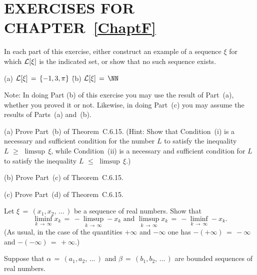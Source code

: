                        \section{EXERCISES FOR CHAPTER~\ref{ChaptF}}
                        \label{SectFEX}

\V
\V
\V
\V

\noindent \ExFa In each part of this exercise, either construct an example of a sequence ${\xi}$ for which ${\cal L}[{\xi}] $ is the indicated set, or show that no such sequence exists.

\V

        (a) ${\cal L}[{\xi}] \,=\, \{-1, 3, {\pi}\}$ \h (b) ${\cal L}[{\xi}] \,=\, {\NN}$

\V
\V


\noindent  \ExFb  Note: In doing Part (b) of this exercise you may use the result of Part~(a), whether you proved it or not.
    Likewise, in doing Part~(c) you may assume the results of Parts~(a) and~(b).

\V

        (a) Prove Part~(b) of Theorem~C.6.15. (Hint: Show that Condition~(i) is a necessary and sufficient condition for the number $L$ to satisfy the inequality $L\,\,{\geq}\,\,\limsup\,{\xi}$,
    while Condition~(ii) is a necessary and sufficient condition for $L$ to satisfy the inequality $L\,\,{\leq}\,\,\limsup\,{\xi}$.)

\V

        (b) Prove Part~(c) of Theorem~C.6.15. %

\V

        (c) Prove Part~(d) of Theorem~C.6.15.

\V
\V

\noindent \ExFc Let ${\xi} \,=\, (x_{1},x_{2},\,{\ldots}\,)$ be a sequence of real numbers.
    Show that
        \begin{displaymath}
        \liminf_{k \,{\rightarrow}\, {\infty}} x_{k} \,=\, -\limsup_{k \,{\rightarrow}\, {\infty}} -x_{k} \mbox{ and }
        \limsup_{k \,{\rightarrow}\, {\infty}} x_{k} \,=\, -\liminf_{k \,{\rightarrow}\, {\infty}} -x_{k}.
        \end{displaymath}
    (As usual, in the case of the quantities $+{\infty}$ and $-{\infty}$ one has $-(+{\infty}) \,=\, -{\infty}$ and $-(-{\infty}) \,=\, +{\infty}$.)

\V
\V

\noindent \ExFd Suppose that ${\alpha} \,=\, (a_{1},a_{2},\,{\ldots}\,)$ and ${\beta} \,=\, (b_{1},b_{2},\,{\ldots}\,)$ are bounded sequences of real numbers.

